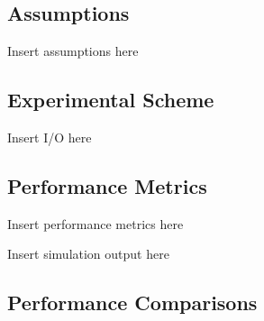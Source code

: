 \documentclass[conference]{IEEEtran}
\begin{document}

\subsection{Assumptions}

Insert assumptions here


\subsection{Experimental Scheme}

Insert I/O here


\subsection{Performance Metrics}

Insert performance metrics here


Insert simulation output here


\subsection{Performance Comparisons}
\end{document}
